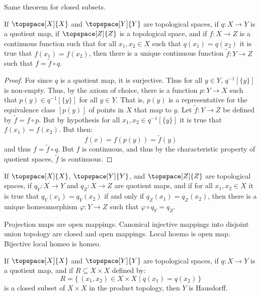     Same theorem for closed subsets.
    \begin{theorem}
        If $\topspace[X]{X}$ and $\topspace[Y]{Y}$ are topological spaces,
        if $q:X\rightarrow{Y}$ is a quotient map, if $\topspace[Z]{Z}$ is a
        topological space, and if $f:X\rightarrow{Z}$ is a continuous
        function such that for all $x_{1},x_{2}\in{X}$ such that
        $q(x_{1})=q(x_{2})$ it is true that $f(x_{1})=f(x_{2})$, then there
        is a unique continuous function $\tilde{f}:Y\rightarrow{Z}$ such
        that $f=\tilde{f}\circ{q}$.
    \end{theorem}
    \begin{proof}
        For since $q$ is a quotient map, it is surjective. Thus for all
        $y\in{Y}$, $q^{\minus{1}}[\{y\}]$ is non-empty. Thus, by the axiom
        of choice, there is a function $p:Y\rightarrow{X}$ such
        that $p(y)\in{q}^{\minus{1}}[\{y\}]$ for all $y\in{Y}$. That is,
        $p(y)$ is a representative for the equivalence class $[p(y)]$ of
        points in $X$ that map to $y$. Let $\tilde{f}:Y\rightarrow{Z}$ be
        defined by $\tilde{f}=f\circ{p}$. But by hypothesis for all
        $x_{1},x_{2}\in{q}^{\minus{1}}[\{y\}]$ it is true that
        $f(x_{1})=f(x_{2})$. But then:
        \begin{equation}
            f(x)=f(p(y))=\tilde{f}(y)
        \end{equation}
        and thus $f=\tilde{f}\circ{q}$. But $f$ is continuous, and thus by
        the characteristic property of quotient spaces, $\tilde{f}$ is
        continuous.
    \end{proof}
    \begin{theorem}
        If $\topspace[X]{X}$, $\topspace[Y]{Y}$, and $\topspace[Z]{Z}$ are
        topological spaces, if $q_{Y}:X\rightarrow{Y}$ and
        $q_{Z}:X\rightarrow{Z}$ are quotient maps, and if for all
        $x_{1},x_{2}\in{X}$ it is true that $q_{Y}(x_{1})=q_{Y}(x_{2})$ if
        and only if $q_{Z}(x_{1})=q_{Z}(x_{2})$, then there is a unique
        homeomorphism $\varphi:Y\rightarrow{Z}$ such that
        $\varphi\circ{q_{Y}}=q_{Z}$.
    \end{theorem}
    Projection maps are open mappings. Canonical injective mappings into
    disjoint union topology are closed and open mappings. Local hoemo is
    open map. Bijective local homeo is homeo.
    \begin{theorem}
        If $\topspace[X]{X}$ and $\topspace[Y]{Y}$ are topological spaces,
        if $q:X\rightarrow{Y}$ is a quotient map, and if
        $R\subseteq{X}\times{X}$ defined by:
        \begin{equation}
            R=\{\,(x_{1},x_{2})\in{X}\times{X}\;|\;q(x_{1})=q(x_{2})\,\}
        \end{equation}
        is a closed subset of $X\times{X}$ in the product topology, then
        $Y$ is Hausdorff.
    \end{theorem}
